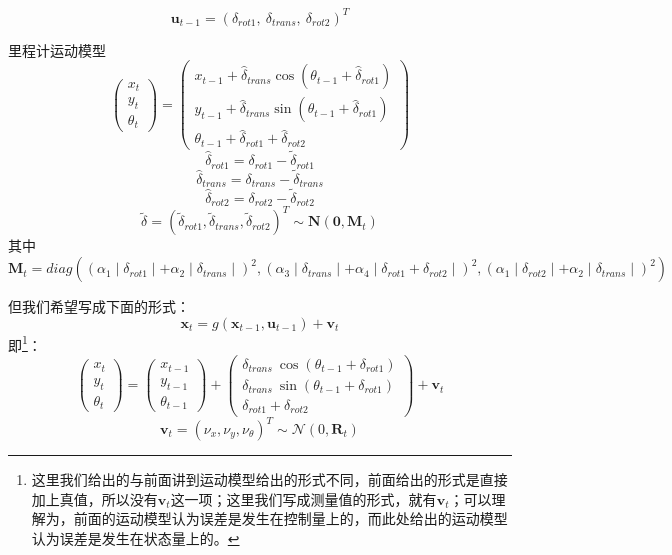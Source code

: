 \documentclass[../main.tex]{subfiles}
\begin{document}
\begin{enumerate}
{{\begin{enumerate}
    
    $$\mathbf{u}_{t-1}=(\delta_{rot1},\ \delta_{trans},\ \delta_{rot2})^T$$
    
    里程计运动模型
    $$\begin{pmatrix}x_t\\y_t\\\theta_t\end{pmatrix}=\begin{pmatrix}x_{t-1}+\hat{\delta}_{trans}\cos(\theta_{t-1}+\hat{\delta}_{rot1})\\y_{t-1}+\hat{\delta}_{trans}\sin(\theta_{t-1}+\hat{\delta}_{rot1})\\\theta_{t-1}+\hat{\delta}_{rot1}+\hat{\delta}_{rot2}\end{pmatrix}$$
    $$\hat{\delta}_{rot1}=\delta_{rot1}-\tilde{\delta}_{rot1}$$
    $$\hat{\delta}_{trans}=\delta_{trans}-\tilde{\delta}_{trans}$$
    $$\hat{\delta}_{rot2}=\delta_{rot2}-\tilde{\delta}_{rot2}$$
    $$\tilde{\delta}=(\tilde{\delta}_{rot1},\tilde{\delta}_{trans},\tilde{\delta}_{rot2})^T\sim\mathbf{N}(\mathbf{0},\mathbf{M}_t)$$
    其中
    $$\mathbf{M}_t=diag((\alpha_1\mid\delta_{rot1}\mid+\alpha_2\mid\delta_{trans}\mid)^2,(\alpha_3\mid\delta_{trans}\mid+\alpha_4\mid\delta_{rot1}+\delta_{rot2}\mid)^2,(\alpha_1\mid\delta_{rot2}\mid+\alpha_2\mid\delta_{trans}\mid)^2)$$


    但我们希望写成下面的形式：
    $$
    \mathbf{x}_t = g(\mathbf{x}_{t-1},\mathbf{u}_{t-1}) + \mathbf{v}_t
    $$
    即\footnote{这里我们给出的与前面讲到运动模型给出的形式不同，前面给出的形式是直接加上真值，所以没有$\mathbf{v}_t$这一项；这里我们写成测量值的形式，就有$\mathbf{v}_t$；可以理解为，前面的运动模型认为误差是发生在控制量上的，而此处给出的运动模型认为误差是发生在状态量上的。}：
    $$
    \begin{pmatrix} x_t\\ y_t\\ \theta_t \end{pmatrix}
    =
    \begin{pmatrix} x_{t-1}\\ y_{t-1}\\ \theta_{t-1} \end{pmatrix}
    +
    \begin{pmatrix}
      \delta_{trans}\ \cos(\theta_{t-1} + \delta_{rot1})\\[4pt]
      \delta_{trans}\ \sin(\theta_{t-1} + \delta_{rot1})\\[4pt]
      \delta_{rot1} + \delta_{rot2}
    \end{pmatrix}
    + \mathbf{v}_t
    $$
    $$
    \mathbf{v}_t = (\nu_x,\nu_y,\nu_\theta)^T \sim \mathcal{N}(0,\mathbf{R}_t)
    $$
    

\end{enumerate}}}
\end{enumerate}
\end{document}
